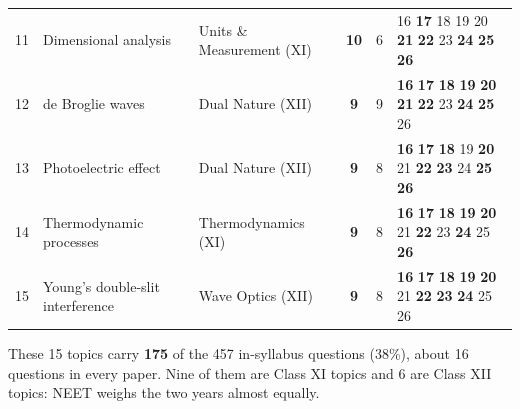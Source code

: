 {\begin{tabularx}{\linewidth}{@{}r@{\hspace{6pt}}>{\raggedright\arraybackslash}Xlcc@{\hspace{6pt}}l@{}}
11 & Dimensional analysis & Units \& Measurement (XI) & \textbf{10} & 6 & {\scriptsize {\color{gray!45}16} \textbf{17} {\color{gray!45}18} {\color{gray!45}19} {\color{gray!45}20} \textbf{21} \textbf{22} {\color{gray!45}23} \textbf{24} \textbf{25} \textbf{26}}\\
12 & de Broglie waves & Dual Nature (XII) & \textbf{9} & 9 & {\scriptsize \textbf{16} \textbf{17} \textbf{18} \textbf{19} \textbf{20} \textbf{21} \textbf{22} {\color{gray!45}23} \textbf{24} \textbf{25} {\color{gray!45}26}}\\
13 & Photoelectric effect & Dual Nature (XII) & \textbf{9} & 8 & {\scriptsize \textbf{16} \textbf{17} \textbf{18} {\color{gray!45}19} \textbf{20} {\color{gray!45}21} \textbf{22} \textbf{23} {\color{gray!45}24} \textbf{25} \textbf{26}}\\
14 & Thermodynamic processes & Thermodynamics (XI) & \textbf{9} & 8 & {\scriptsize \textbf{16} \textbf{17} \textbf{18} \textbf{19} \textbf{20} {\color{gray!45}21} \textbf{22} {\color{gray!45}23} \textbf{24} {\color{gray!45}25} \textbf{26}}\\
15 & Young's double-slit interference & Wave Optics (XII) & \textbf{9} & 8 & {\scriptsize \textbf{16} \textbf{17} \textbf{18} \textbf{19} \textbf{20} {\color{gray!45}21} \textbf{22} \textbf{23} \textbf{24} {\color{gray!45}25} {\color{gray!45}26}}\\
\bottomrule\end{tabularx}}\par\medskip
{\small These 15 topics carry \textbf{175} of the 457 in-syllabus questions (38\%), about 16 questions in every paper. Nine of them are Class XI topics and 6 are Class XII topics: NEET weighs the two years almost equally.}\par\medskip
